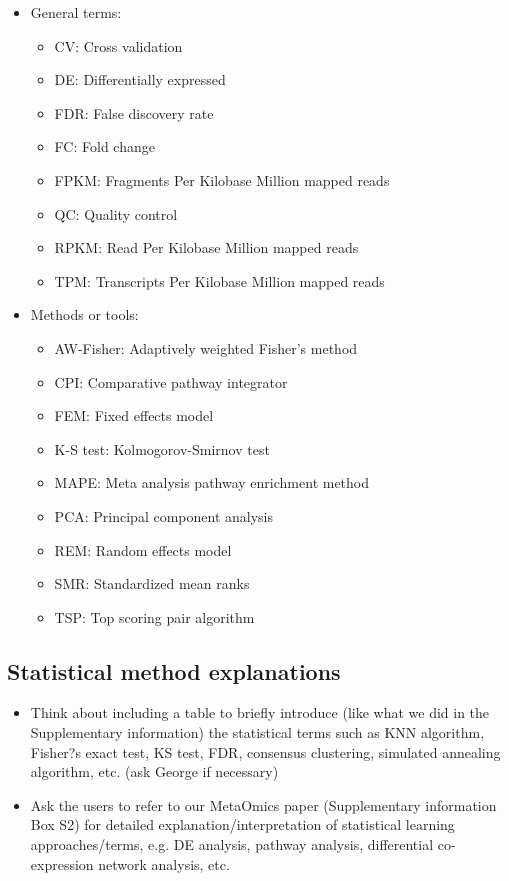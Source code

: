 \begin{itemize}
\item General terms:
\begin{itemize}
\item CV: Cross validation
\item DE:  Differentially expressed
\item FDR: False discovery rate
\item FC: Fold change
\item FPKM: Fragments Per Kilobase Million mapped reads
\item QC: Quality control
\item RPKM: Read Per Kilobase Million mapped reads
\item TPM: Transcripts Per Kilobase Million mapped reads
\end{itemize}

\item Methods or tools:
\begin{itemize}
\item AW-Fisher: Adaptively weighted Fisher's method
\item CPI: Comparative pathway integrator 
\item FEM: Fixed effects model
\item K-S test: Kolmogorov-Smirnov test
\item MAPE: Meta analysis pathway enrichment method
\item PCA: Principal component analysis
\item REM: Random effects model
\item SMR: Standardized mean ranks
\item TSP: Top scoring pair algorithm

\end{itemize}

\end{itemize}

\subsection{Statistical method explanations}

{\color{red}
\begin{itemize}
\item
Think about including a table to briefly introduce (like what we did in the Supplementary information) the statistical terms such as KNN algorithm, 
Fisher?s exact test, KS test, FDR, consensus clustering, simulated annealing algorithm, etc. (ask George if necessary)
\item
Ask the users to refer to our MetaOmics paper (Supplementary information Box S2) for detailed explanation/interpretation of statistical learning approaches/terms, e.g. DE analysis, pathway analysis, differential co-expression network analysis, etc.
\end{itemize}

}

